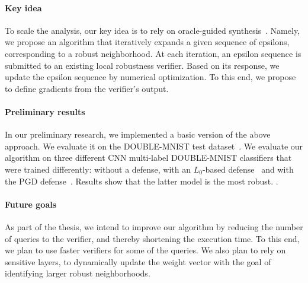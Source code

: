 \paragraph{Key idea} To scale the analysis, our key idea is to rely on oracle-guided synthesis~\cite{OracleGuided}.
Namely, we propose an algorithm that iteratively expands a given sequence of epsilons, corresponding to a robust neighborhood.
At each iteration, an epsilon sequence is submitted to an existing local robustness verifier. %
Based on its response, we update the epsilon sequence by numerical optimization.
To this end, we propose to define gradients from the verifier's output. %

\paragraph{Preliminary results}
In our preliminary research, we implemented a basic version of the above approach.
We evaluate it on the DOUBLE-MNIST test dataset~\cite{DoubleMNIST}.
We evaluate our algorithm on three different CNN multi-label DOUBLE-MNIST classifiers that were trained differently: without a defense, with an $L_0$-based defense~\cite{L0} and with the PGD defense~\cite{PGD}.
Results show that the latter model is the most robust. %
.
\paragraph{Future goals}
As part of the thesis, we intend to improve our algorithm by reducing the number of queries to the verifier, and thereby shortening the execution time.
To this end, we plan to use faster verifiers for some of the queries. %
We also plan to rely on sensitive layers, to dynamically update the weight vector with the goal of identifying larger robust neighborhoods. %

